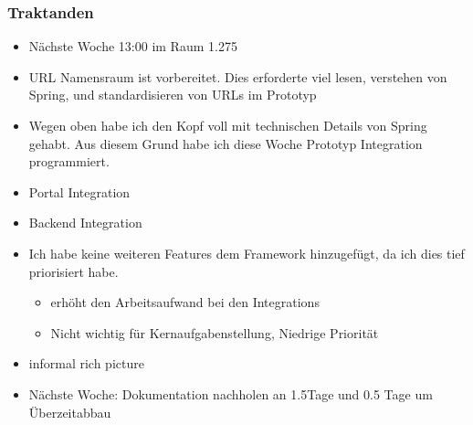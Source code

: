 \documentclass{article}
\begin{document}
\subsubsection{Traktanden}
\begin{itemize}
    \item Nächste Woche 13:00 im Raum 1.275
    \item URL Namensraum ist vorbereitet. Dies erforderte viel lesen, verstehen von Spring, und standardisieren von URLs im Prototyp
    \item Wegen oben habe ich den Kopf voll mit technischen Details von Spring gehabt. Aus diesem Grund habe ich diese Woche Prototyp Integration programmiert.
    \item Portal Integration
    \item Backend Integration
    \item Ich habe keine weiteren Features dem Framework hinzugefügt, da ich dies tief priorisiert habe.
    \begin{itemize}
        \item erhöht den Arbeitsaufwand bei den Integrations
        \item Nicht wichtig für Kernaufgabenstellung, Niedrige Priorität
    \end{itemize}
    \item informal rich picture 
    \item Nächste Woche: Dokumentation nachholen an 1.5Tage und 0.5 Tage um Überzeitabbau
\end{itemize}
\end{document}
